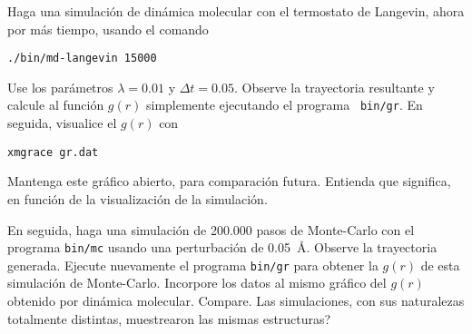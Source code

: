 \documentclass[10pt,a4paper,ssfamily]{exam}
\newcommand{\1}{{\bf 1}}
\newcommand{\2}{{\bf 2}}
\newcommand{\3}{{\bf 3}}
\newcommand{\command}[1]{\begin{center}{\tt #1}\end{center}}
\begin{document}
Haga una simulación de dinámica molecular con el termostato de Langevin,
ahora por más tiempo, 
usando el comando 
\command{./bin/md-langevin 15000}
Use los parámetros
$\lambda=0.01$ y $\Delta t=0.05$. Observe la trayectoria resultante y
calcule al función $g(r)$ simplemente ejecutando el programa {\tt
bin/gr}. En seguida, visualice el $g(r)$ con
\command{xmgrace gr.dat} 
Mantenga este gráfico abierto, para comparación futura. Entienda que
significa, en función de la visualización de la simulación. 

En seguida, haga una simulación de 200.000 pasos de Monte-Carlo con el programa 
{\tt bin/mc} usando una perturbación de 0.05~\AA. Observe la trayectoria
generada. Ejecute nuevamente el
programa {\tt bin/gr} para obtener la $g(r)$ de esta simulación de
Monte-Carlo. Incorpore los datos al mismo gráfico del $g(r)$ obtenido
por dinámica molecular. Compare. Las simulaciones, con sus naturalezas
totalmente distintas, muestrearon las mismas estructuras?  
\end{document}
